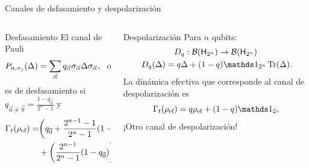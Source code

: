 \begin{frame}{Canales de dsfasamiento y despolarización}
    \begin{columns}
        \begin{column}{0.5\textwidth}
            \begin{block}{Desfasamiento}
                El canal de Pauli
                \begin{equation}
                    P_{n,\sigma_{j}}(\Delta)=\sum_{\vec{\alpha}}q_{\vec{\alpha}}\sigma_{\vec{\alpha}}\Delta\sigma_{\vec{\alpha}}, \,\text{ }\, \alpha_{k}\in\{0,j\}\nonumber
                \end{equation}
                es  de desfasamiento si $q_{\vec{\alpha}\neq\vec{0}}=\frac{1-q_{\vec{0} }}{2^{n}-1}$ y 
                \begin{align}
                    \Gamma_{t}(\rho_{\text{ef}})=&\qty(q_{\vec{0}}+\frac{2^{n-1}-1}{2^{n}-1}(1-q_{\vec{0}}))\rho_{\text{ef}}\nonumber\\
                    &+\qty(\frac{2^{n-1}}{2^{n}-1}(1-q_{\vec{0}}))\sigma_{j}\rho_{\text{ef}}\sigma_{j}.\nonumber
                \end{align}
            \end{block}
        \end{column}
        \begin{column}{0.5\textwidth}
            \begin{block}{Despolarización}
                Para $n$ qubits:
                \begin{equation}
                    \begin{gathered}
                    D_{q}:\mcB(\hilbert_{2^{n}}) \rightarrow \mcB(\hilbert_{2^{n}})\\
                    D_{q}(\Delta)=q\Delta+(1-q)\Id_{2^{n}}\Tr(\Delta)\rlap{.}
                \end{gathered}\nonumber
            \end{equation}
                La dinámica efectiva que corresponde al canal de despolarización es
                \begin{equation}
                    \Gamma_{t}(\rho_{\ef})=q\rho_{\ef}+(1-q)\Id_{2},\nonumber
                \end{equation}
                ¡Otro canal de despolarización!
            \end{block}
        \end{column}
    \end{columns}
\end{frame}

